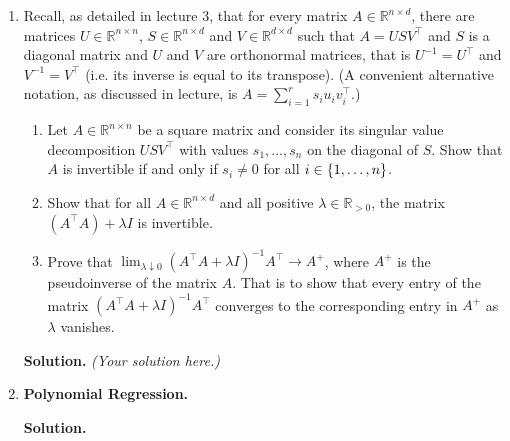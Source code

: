 \documentclass{article}
\def\R{\mathbb{R}}
\theoremstyle{definition}
\theoremstyle{remark}
\newenvironment{Q}
        {%
          \clearpage
          \item
        }
        {%
          \phantom{s} %
          \bigskip
          \textbf{Solution.}
        }
\begin{document}
\begin{enumerate}
\begin{Q}
          Recall, as detailed in lecture 3,
          that for every matrix $A \in \R^{n \times d}$, there are matrices $U \in \R^{n \times n}$, $S \in \R^{n \times d}$ and $V \in \R^{d \times d}$ such that $A = U S V^\top$ and $S$ is a diagonal matrix and $U$ and $V$ are orthonormal matrices, that is $U^{-1} = U^\top$ and $V^{-1} = V^\top$ (i.e. its inverse is equal to its transpose).
          (A convenient alternative notation, as discussed in lecture, is $A = \sum_{i=1}^r s_i u_i v_i^\top$.)
          \begin{enumerate}
            \item Let $A \in \R^{n \times n}$ be a square matrix and consider its singular value decomposition $U S V^\top$ with values $s_1, \ldots, s_n$ on the diagonal of $S$. Show that $A$ is invertible if and only if $s_i \neq 0$ for all $i \in \set{1,\ldots,n}$.
            \item Show that for all $A \in \R^{n \times d}$ and all positive $\lambda \in \R_{>0}$, the matrix $(A^\top A)+\lambda I$ is invertible.
            \item Prove that $\lim_{\lambda \downarrow 0} (A^\top A + \lambda I)^{-1} A^\top \to A^+$, where $A^+$ is the pseudoinverse of the matrix $A$. That is to show that every entry of the matrix $(A^\top A + \lambda I)^{-1} A^\top$ converges to the corresponding entry in $A^+$ as $\lambda$ vanishes.
          \end{enumerate}
          \end{Q}
          \emph{(Your solution here.)}


          \begin{Q}
          \textbf{Polynomial Regression.}


\end{Q}
\end{enumerate}
\end{document}
